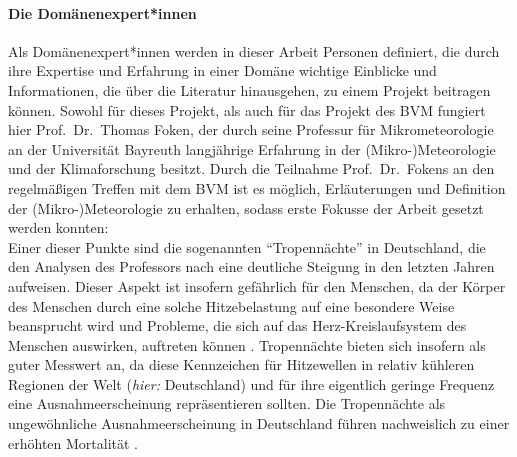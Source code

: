 \paragraph{Die Domänenexpert*innen}
Als Domänenexpert*innen werden in dieser Arbeit Personen definiert, die durch ihre Expertise und Erfahrung in einer Domäne wichtige Einblicke und Informationen, die über die Literatur hinausgehen, zu einem Projekt beitragen können. Sowohl für dieses Projekt, als auch für das Projekt des \ac{BVM} fungiert hier Prof.\ Dr.\ Thomas Foken, der durch seine Professur für Mikrometeorologie an der Universität Bayreuth langjährige Erfahrung in der (Mikro-)Meteorologie und der Klimaforschung besitzt. Durch die Teilnahme Prof.\ Dr.\ Fokens an den regelmäßigen Treffen mit dem \ac{BVM} ist es möglich, Erläuterungen und Definition der (Mikro-)Meteorologie zu erhalten, sodass erste Fokusse der Arbeit gesetzt werden konnten: \\ Einer dieser Punkte sind die sogenannten \enquote{Tropennächte} in Deutschland, die den Analysen des Professors nach eine deutliche Steigung in den letzten Jahren aufweisen. Dieser Aspekt ist insofern gefährlich für den Menschen, da der Körper des Menschen durch eine solche Hitzebelastung auf eine besondere Weise beansprucht wird und Probleme, die sich auf das Herz-Kreislaufsystem des Menschen auswirken, auftreten können \cite{Umweltbundesamt2023Hitze}. Tropennächte bieten sich insofern als guter Messwert an, da diese Kennzeichen für Hitzewellen in relativ kühleren Regionen der Welt (\textit{hier:} Deutschland) und für ihre eigentlich geringe Frequenz eine Ausnahmeerscheinung repräsentieren sollten. Die Tropennächte als ungewöhnliche Ausnahmeerscheinung in Deutschland führen nachweislich zu einer erhöhten Mortalität \cite{fenner2015innerstadtische}.


